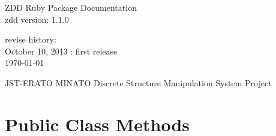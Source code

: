 \documentclass[a4paper]{book}
\begin{document}
\begin{titlepage}
\begin{center}
{\huge ZDD Ruby Package Documentation}\\
\vspace{10truept}
{\normalsize zdd version: 1.1.0}\\
\vspace{1cm}

revise history:\\
October 10, 2013 : first release\\
\vspace{18cm}
{\small \today}

{\small JST-ERATO MINATO Discrete Structure Manipulation System Project}
\end{center}
\end{titlepage}

\setcounter{tocdepth}{1}
\tableofcontents


\tableofcontents







\chapter[Methods]{Public Class Methods}







\end{document}
